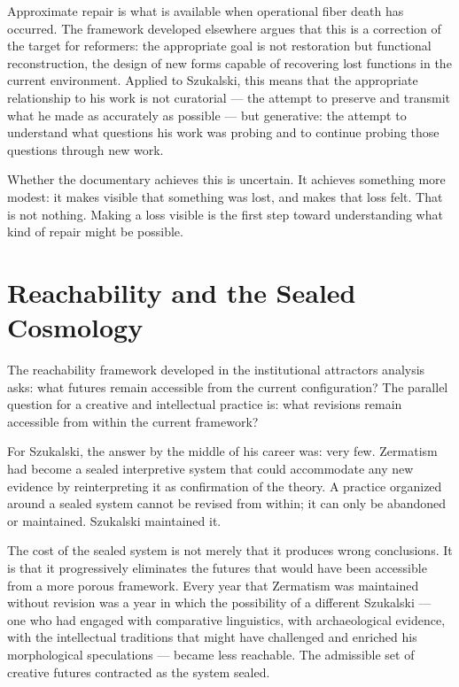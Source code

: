 \documentclass[11pt, a4paper]{article}
\theoremstyle{named}
\begin{document}
Approximate repair is what is available when operational fiber death
has occurred. The framework developed elsewhere argues that this is
a correction of the target for reformers: the appropriate goal is
not restoration but functional reconstruction, the design of new
forms capable of recovering lost functions in the current environment.
Applied to Szukalski, this means that the appropriate relationship
to his work is not curatorial — the attempt to preserve and transmit
what he made as accurately as possible — but generative: the attempt
to understand what questions his work was probing and to continue
probing those questions through new work.

Whether the documentary achieves this is uncertain. It achieves
something more modest: it makes visible that something was lost,
and makes that loss felt. That is not nothing. Making a loss visible
is the first step toward understanding what kind of repair might be
possible.

\section{Reachability and the Sealed Cosmology}

The reachability framework developed in the institutional attractors
analysis asks: what futures remain accessible from the current
configuration? The parallel question for a creative and intellectual
practice is: what revisions remain accessible from within the current
framework?

For Szukalski, the answer by the middle of his career was: very few.
Zermatism had become a sealed interpretive system that could
accommodate any new evidence by reinterpreting it as confirmation of
the theory. A practice organized around a sealed system cannot be
revised from within; it can only be abandoned or maintained. Szukalski
maintained it.

The cost of the sealed system is not merely that it produces wrong
conclusions. It is that it progressively eliminates the futures that
would have been accessible from a more porous framework. Every year
that Zermatism was maintained without revision was a year in which
the possibility of a different Szukalski — one who had engaged with
comparative linguistics, with archaeological evidence, with the
intellectual traditions that might have challenged and enriched his
morphological speculations — became less reachable. The admissible
set of creative futures contracted as the system sealed.
\end{document}
